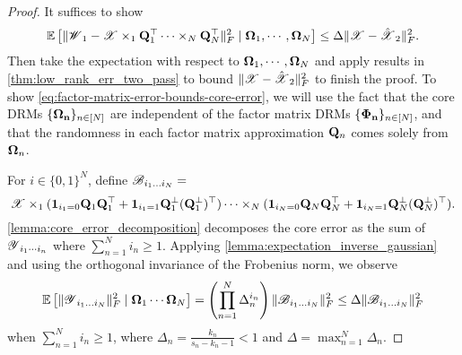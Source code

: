 \begin{proof}
It suffices to show
\begin{equation}\label{eq:factor-matrix-error-bounds-core-error}
\mathbb{E}\left[ \|\T{W}_1 - \T{X}\times_1 \M{Q}_1^\top \dots \times_N \M{Q}_N^\top\|_F^2 \mid \M{\Omega}_1, \cdots, \M{\Omega}_N \right] \le \Delta  \|\T{X} - \hat{\T{X}}_2\|_F^2.
\end{equation}
Then take the expectation with respect to $\mathbf{\Omega}_1, \cdots,  \mathbf{\Omega}_N$
and apply results in \ref{thm:low_rank_err_two_pass} to bound $\|\T{X} - \hat{\T{X}}_2\|_F^2$ to finish the proof.
To show \ref{eq:factor-matrix-error-bounds-core-error},
we will use the fact that the core DRMs $\{\mathbf{\Omega_n}\}_{n \in [N]}$
are independent of the factor matrix DRMs $\{\mathbf{\Phi_n}\}_{n \in [N]}$,
and that the randomness in
each factor matrix approximation $\mathbf{Q}_n$
comes solely from $\mathbf{\Omega}_n$.

For $i\in \{0,1\}^N$, define $\T{B}_{i_1\dots i_N} =$
\[
\T{X}\times_1 (\mathbf{1}_{i_1=0}\M{Q}_1\M{Q}_1^\top + \mathbf{1}_{i_1=1}\M{Q}_1^\bot(\M{Q}_1^\bot)^\top)\cdots\times_N(\mathbf{1}_{i_N=0}\M{Q}_N\M{Q}_N^\top + \mathbf{1}_{i_N=1}\M{Q}_N^\bot(\M{Q}_N^\bot)^\top).
\]
\ref{lemma:core_error_decomposition} decomposes the core error as the sum of
$\T{Y}_{i_1\cdots i_n}$ where $\sum_{n=1}^N i_n \geq 1$.
Applying \ref{lemma:expectation_inverse_gaussian} and using 
the orthogonal invariance of the Frobenius norm,  we observe
\begin{equation}
\mathbb{E} \left[ \|\T{Y}_{i_1\dots i_N}\|_F^2 \mid \M{\Omega}_1 \cdots \M{\Omega}_N \right] =\left(\prod_{n=1}^N \Delta_n^{i_n}\right)
\|\T{B}_{i_1\dots i_N}\|_F^2 \le \Delta \|\T{B}_{i_1\dots i_N}\|_F^2\nonumber
\end{equation}
when $\sum_{n=1}^N i_n \geq 1$,
where $\Delta_n = \frac{k_n}{s_n-k_n-1}<1$ and $\Delta = \max_{n=1}^N \Delta_n$.


\end{proof}
